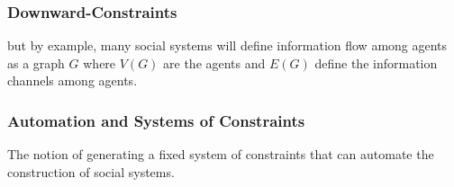 \documentclass{article}
\begin{document}
\subsubsection{Downward-Constraints}
but by example, many social systems will define information flow among agents as a graph $G$ where $V(G)$ are the agents and $E(G)$ define the information channels among agents. 


\subsubsection{Automation and Systems of Constraints}
The notion of generating a fixed system of constraints that can automate the construction of social systems.
\end{document}
